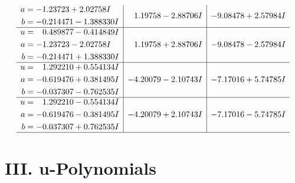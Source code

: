 \documentclass[1p]{elsarticle_modified}
\theoremstyle{definition}
\begin{document}
$$\begin{array}{c|c|c}
\begin{aligned}
a &= -1.23723 + 2.02758 I \\
b &= -0.214471 - 1.388330 I\end{aligned}
 & \phantom{-}1.19758 - 2.88706 I & -9.08478 + 2.57984 I \\ \hline\begin{aligned}
u &= \phantom{-}0.489877 - 0.414849 I \\
a &= -1.23723 - 2.02758 I \\
b &= -0.214471 + 1.388330 I\end{aligned}
 & \phantom{-}1.19758 + 2.88706 I & -9.08478 - 2.57984 I \\ \hline\begin{aligned}
u &= \phantom{-}1.292210 + 0.554134 I \\
a &= -0.619476 + 0.381495 I \\
b &= -0.037307 - 0.762535 I\end{aligned}
 & -4.20079 - 2.10743 I & -7.17016 + 5.74785 I \\ \hline\begin{aligned}
u &= \phantom{-}1.292210 - 0.554134 I \\
a &= -0.619476 - 0.381495 I \\
b &= -0.037307 + 0.762535 I\end{aligned}
 & -4.20079 + 2.10743 I & -7.17016 - 5.74785 I\\
 \hline 
 \end{array}$$\newpage
\newpage\renewcommand{\arraystretch}{1}
\centering \section*{ III. u-Polynomials}
\end{document}
